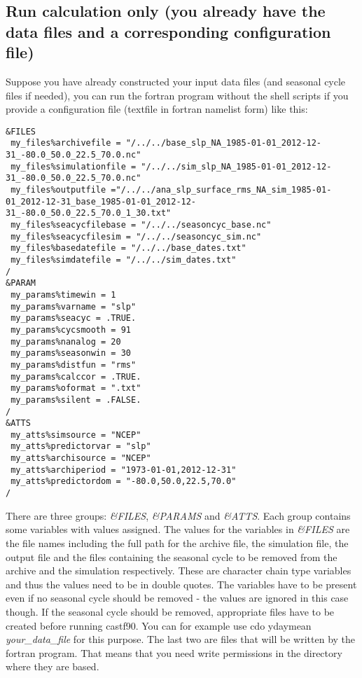 \documentclass[11p,a4paper]{article}
\begin{document}
\subsection{Run calculation only (you already have the data files and a corresponding configuration file)}
Suppose you have already constructed your input data files (and seasonal cycle files if needed), you can run the fortran program without the shell scripts if you provide a configuration file (textfile in fortran namelist form) like this:
\begin{verbatim}
&FILES
 my_files%archivefile = "/../../base_slp_NA_1985-01-01_2012-12-31_-80.0_50.0_22.5_70.0.nc"
 my_files%simulationfile = "/../../sim_slp_NA_1985-01-01_2012-12-31_-80.0_50.0_22.5_70.0.nc"
 my_files%outputfile ="/../../ana_slp_surface_rms_NA_sim_1985-01-01_2012-12-31_base_1985-01-01_2012-12-31_-80.0_50.0_22.5_70.0_1_30.txt"
 my_files%seacycfilebase = "/../../seasoncyc_base.nc"
 my_files%seacycfilesim = "/../../seasoncyc_sim.nc"
 my_files%basedatefile = "/../../base_dates.txt"
 my_files%simdatefile = "/../../sim_dates.txt"
/
&PARAM
 my_params%timewin = 1
 my_params%varname = "slp"
 my_params%seacyc = .TRUE.
 my_params%cycsmooth = 91
 my_params%nanalog = 20
 my_params%seasonwin = 30
 my_params%distfun = "rms"
 my_params%calccor = .TRUE.
 my_params%oformat = ".txt"
 my_params%silent = .FALSE.
/
&ATTS
 my_atts%simsource = "NCEP"
 my_atts%predictorvar = "slp"
 my_atts%archisource = "NCEP"
 my_atts%archiperiod = "1973-01-01,2012-12-31"
 my_atts%predictordom = "-80.0,50.0,22.5,70.0"
/
\end{verbatim}
There are three groups: \textit{\&FILES}, \textit{\&PARAMS} and \textit{\&ATTS}. Each group contains some variables with values assigned. The values for the variables in \textit{\&FILES} are the file names including the full path for the archive file, the simulation file, the output file and the files containing the seasonal cycle to be removed from the archive and the  simulation respectively.  These are character chain type variables and thus the values need to be in double quotes. The variables have to be present even if no seasonal cycle should be removed - the values are ignored in this case though. If the seasonal cycle should be removed, appropriate files have to be created before running castf90. You can for example use cdo ydaymean \textit{your\_data\_file} for this purpose. The last two are files that will be written by the fortran program. That means that you need write permissions in the directory where they are based.
\end{document}
